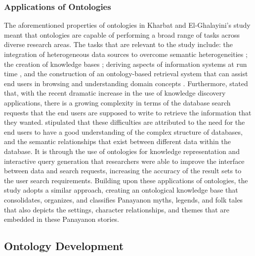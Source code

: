 \subsubsection {Applications of Ontologies}
The aforementioned properties of ontologies in Kharbat and El-Ghalayini’s study  meant that ontologies are capable of performing a broad range of tasks across diverse research areas. The tasks that are relevant to the study include: the integration of heterogeneous data sources to overcome semantic heterogeneities \cite{lacroix2003bioinformatics}; the creation of knowledge bases \cite{noy2001ontology}; deriving aspects of information systems at run time \cite{guarino1998formal}, and the construction of an ontology-based retrieval system that can assist end users in browsing and understanding domain concepts \cite{baker1999ontology}. Furthermore,  stated that, with the recent dramatic increase in the use of knowledge discovery applications, there is a growing complexity in terms of the database search requests that the end users are supposed to write to retrieve the information that they wanted.  stipulated that these difficulties are attributed to the need for the end users to have a good understanding of the complex structure of databases, and the semantic relationships that exist between different data within the database. It is through the use of ontologies for knowledge representation and interactive query generation that researchers were able to improve the interface between data and search requests, increasing the accuracy of the result sets to the user search requirements. Building upon these applications of ontologies, the study adopts a similar approach, creating an ontological knowledge base that consolidates, organizes, and classifies Panayanon  myths, legends,  and folk tales that also depicts the settings, character relationships, and themes that are embedded in these Panayanon stories.

\subsection{Ontology Development}

